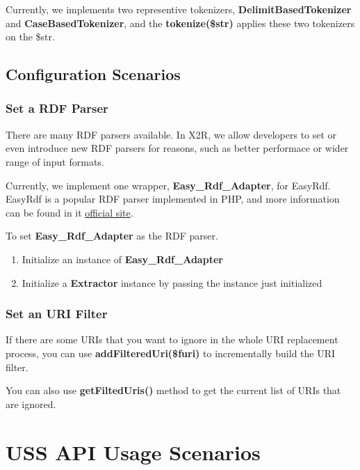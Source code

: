 \documentclass[letterpaper,10pt,english]{sphinxmanual}
\begin{document}
Currently, we implements two representive tokenizers, \textbf{DelimitBasedTokenizer} and \textbf{CaseBasedTokenizer}, and the \textbf{tokenize(\$str)} applies these two tokenizers on the \$str.


\subsection{Configuration Scenarios}
\label{docs/scenarios/extractor:configuration-scenarios}

\subsubsection{Set a RDF Parser}
\label{docs/scenarios/extractor:set-a-rdf-parser}
There are many RDF parsers available. In X2R, we allow developers to set or even introduce new RDF parsers for reasons, such as better performace or wider range of input formats.

Currently, we implement one wrapper, \textbf{Easy\_Rdf\_Adapter}, for EasyRdf. EasyRdf is a popular RDF parser implemented in PHP, and more information can be found in it \href{http://www.easyrdf.org/}{official site}.

To set \textbf{Easy\_Rdf\_Adapter} as the RDF parser.
\begin{enumerate}
\item {} 
Initialize an instance of \textbf{Easy\_Rdf\_Adapter}

\item {} 
Initialize a \textbf{Extractor} instance by passing the instance just initialized

\end{enumerate}


\subsubsection{Set an URI Filter}
\label{docs/scenarios/extractor:set-an-uri-filter}
If there are some URIs that you want to ignore in the whole URI replacement process, you can use \textbf{addFilteredUri(\$furi)} to incrementally build the URI filter.

You can also use \textbf{getFiltedUris()} method to get the current list of URIs that are ignored.


\section{USS API Usage Scenarios}
\label{docs/scenarios/uss::doc}\label{docs/scenarios/uss:uss-api-usage-scenarios}
\end{document}
